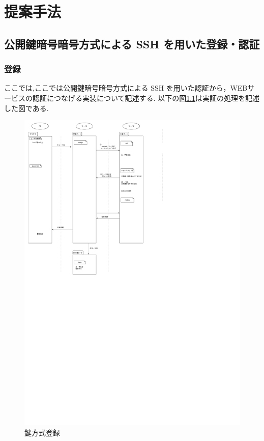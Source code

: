 \chapter{提案手法}
\label{chap:propose}

\section{公開鍵暗号暗号方式による SSH を用いた登録・認証}
    \subsection{登録}
        ここでは,ここでは公開鍵暗号暗号方式による SSH を用いた認証から，WEBサービスの認証につなげる実装について記述する.
        以下の図\ref{registration}は実証の処理を記述した図である.
        \begin{figure}[H]
            \includegraphics[width=13cm]{fig/chapter3/registration/key_register.pdf}
            \caption{鍵方式登録}
            \label{registration}
        \end{figure}
